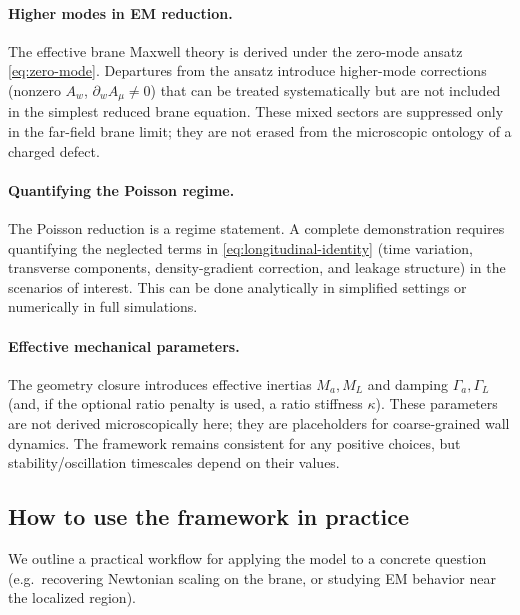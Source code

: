 \documentclass[11pt]{article}
\begin{document}
\paragraph{Higher modes in EM reduction.}
The effective brane Maxwell theory is derived under the zero-mode ansatz \eqref{eq:zero-mode}. Departures from the ansatz introduce higher-mode corrections (nonzero $A_w$, $\partial_w A_\mu\neq 0$) that can be treated systematically but are not included in the simplest reduced brane equation. These mixed sectors are suppressed only in the far-field brane limit; they are not erased from the microscopic ontology of a charged defect.

\paragraph{Quantifying the Poisson regime.}
The Poisson reduction is a regime statement. A complete demonstration requires quantifying the neglected terms in \eqref{eq:longitudinal-identity} (time variation, transverse components, density-gradient correction, and leakage structure) in the scenarios of interest. This can be done analytically in simplified settings or numerically in full simulations.

\paragraph{Effective mechanical parameters.}
The geometry closure introduces effective inertias $M_a,M_L$ and damping $\Gamma_a,\Gamma_L$ (and, if the optional ratio penalty is used, a ratio stiffness $\kappa$). These parameters are not derived microscopically here; they are placeholders for coarse-grained wall dynamics. The framework remains consistent for any positive choices, but stability/oscillation timescales depend on their values.

\subsection{How to use the framework in practice}
\label{sec:discussion-howto}

We outline a practical workflow for applying the model to a concrete question (e.g.\ recovering Newtonian scaling on the brane, or studying EM behavior near the localized region).
\end{document}
